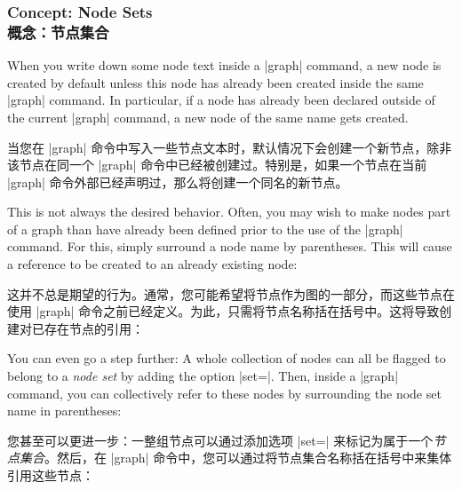 \subsubsection{Concept: Node Sets\\概念：节点集合}

When you write down some node text inside a |graph| command, a new node is
created by default unless this node has already been created inside the same
|graph| command. In particular, if a node has already been declared outside of
the current |graph| command, a new node of the same name gets created.

当您在 |graph| 命令中写入一些节点文本时，默认情况下会创建一个新节点，除非该节点在同一个 |graph| 命令中已经被创建过。特别是，如果一个节点在当前 |graph| 命令外部已经声明过，那么将创建一个同名的新节点。

This is not always the desired behavior. Often, you may wish to make nodes part
of a graph than have already been defined prior to the use of the |graph|
command. For this, simply surround a node name by parentheses. This will cause
a reference to be created to an already existing node:

这并不总是期望的行为。通常，您可能希望将节点作为图的一部分，而这些节点在使用 |graph| 命令之前已经定义。为此，只需将节点名称括在括号中。这将导致创建对已存在节点的引用：

%
\begin{codeexample}[preamble={\usetikzlibrary{graphs}}]
\end{codeexample}

You can even go a step further: A whole collection of nodes can all be flagged
to belong to a \emph{node set} by adding the option |set=|.
Then, inside a |graph| command, you can collectively refer to these nodes by
surrounding the node set name in parentheses:

您甚至可以更进一步：一整组节点可以通过添加选项 |set=| 来标记为属于一个\emph{节点集合}。然后，在 |graph| 命令中，您可以通过将节点集合名称括在括号中来集体引用这些节点：
%
\begin{codeexample}[preamble={\usetikzlibrary{graphs,shapes.geometric}}]
\end{codeexample}


